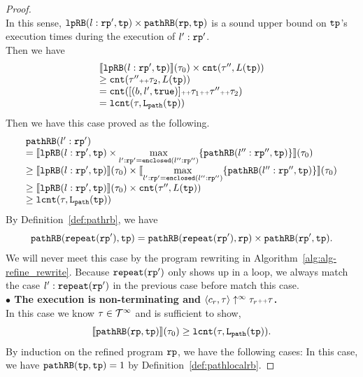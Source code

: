 \begin{proof}
\\
In this sense, $\mathtt{lpRB}(l:\mathtt{rp}', \mathtt{tp}) \times \mathtt{pathRB}(\mathtt{rp}, \mathtt{tp})$ is a sound upper bound on $\mathtt{tp}$'s execution times during the execution of $l': \mathtt{rp}'$.
\\
Then we have
\[
  \begin{array}{l}
  \llbracket  \mathtt{lpRB}(l:\mathtt{rp}', \mathtt{tp}) \rrbracket(\mathtt{\tau}_0) \times \mathtt{cnt}(\mathtt{\tau}'', L(\mathtt{tp})) \\
  \geq \mathtt{cnt}(\mathtt{\tau}'' {\scriptscriptstyle ++} \mathtt{\tau}_2, L(\mathtt{tp}))\\
  = \mathtt{cnt}([(b, l', \mathtt{true})] {\scriptscriptstyle ++} \mathtt{\tau}_1 {\scriptscriptstyle ++} \mathtt{\tau}'' {\scriptscriptstyle ++} \mathtt{\tau}_2)\\
  = \mathtt{lcnt}(\mathtt{\tau}, \mathtt{L}_{\mathtt{path}}(\mathtt{tp}))
  \end{array}
\]
Then we have this case proved as the following.
\[
  \begin{array}{l}
  \mathtt{pathRB}(l':\mathtt{rp}') \\
  = \llbracket  \mathtt{lpRB}(l:\mathtt{rp}', \mathtt{tp}) \times \max\limits_{l': \mathtt{rp}' = \mathtt{enclosed}(l'':\mathtt{rp}'')} \{\mathtt{pathRB}(l'':\mathtt{rp}'', \mathtt{tp})\} \rrbracket(\mathtt{\tau}_0) \\
  \geq \llbracket  \mathtt{lpRB}(l:\mathtt{rp}', \mathtt{tp})  \rrbracket(\mathtt{\tau}_0) \times
  \llbracket \max\limits_{l': \mathtt{rp}' = \mathtt{enclosed}(l'':\mathtt{rp}'')} \{\mathtt{pathRB}(l'':\mathtt{rp}'', \mathtt{tp})\} \rrbracket 
  (\mathtt{\tau}_0) \\
  \geq \llbracket  \mathtt{lpRB}(l:\mathtt{rp}', \mathtt{tp}) \rrbracket(\mathtt{\tau}_0) \times \mathtt{cnt}(\mathtt{\tau}'', L(\mathtt{tp})) \\
  \geq \mathtt{lcnt}(\mathtt{\tau}, \mathtt{L}_{\mathtt{path}}(\mathtt{tp}))
  \end{array}
\]
%
By Definition~\ref{def:pathrb}, we have
\[
  \mathtt{pathRB}(\mathtt{repeat}(\mathtt{rp}'), \mathtt{tp}) = \mathtt{pathRB}(\mathtt{repeat}(\mathtt{rp}'), \mathtt{rp}) \times \mathtt{pathRB}(\mathtt{rp}', \mathtt{tp}).
\]
We will never meet this case by the program rewriting in Algorithm~\ref{alg:alg-refine_rewrite}.
Because $\mathtt{repeat}(\mathtt{rp}')$ only shows up in a loop, we always match the case $l' : \mathtt{repeat}(\mathtt{rp}')$ in the previous case before match this case.
%
\\
\textbf{$\bullet$ The execution is non-terminating and {$\langle {c_r}, \mathtt{\tau} \rangle \uparrow^{\infty} \mathtt{\tau}_r {\scriptscriptstyle ++} \mathtt{\tau}$}.} 
\\
 In this case we know $\mathtt{\tau} \in \mathcal{T}^{\infty}$ and is sufficient to show,
\[
  \llbracket \mathtt{pathRB}(\mathtt{rp}, \mathtt{tp}) \rrbracket(\mathtt{\tau}_0) \geq \mathtt{lcnt}(\mathtt{\tau}, \mathtt{L}_{\mathtt{path}}(\mathtt{tp})).
\]
By induction on the refined program $\mathtt{rp}$,
we have the following cases:
\caseL{$\rprog = \tpath$}
In this case, we have $\mathtt{pathRB}(\mathtt{tp}, \mathtt{tp}) = 1$ by Definition~\ref{def:pathlocalrb}. 

\end{proof}
